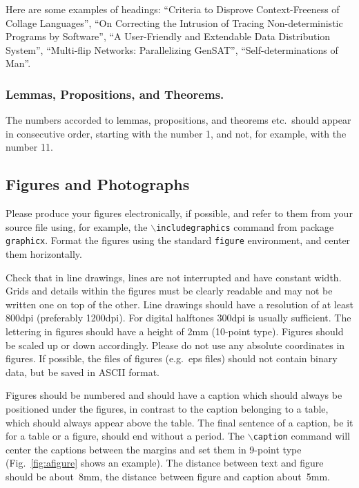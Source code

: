 \documentclass[runningheads]{comsis2}
\begin{document}
Here are some examples of headings: ``Criteria to Disprove Context-Freeness of
Collage Languages'', ``On Correcting the Intrusion of Tracing
Non-deterministic Programs by Software'', ``A User-Friendly and Extendable
Data Distribution System'', ``Multi-flip Networks: Parallelizing GenSAT'',
``Self-determinations of Man''.

\subsubsection{Lemmas, Propositions, and Theorems.} The numbers accorded to lemmas,
propositions, and theorems etc.\ should appear in consecutive order, starting
with the number 1, and not, for example, with the number 11.

\subsection{Figures and Photographs}

Please produce your figures electronically, if possible, and refer to them
from your source file using, for example, the
\texttt{$\backslash$includegraphics} command from package \texttt{graphicx}.
Format the figures using the standard \texttt{figure} environment, and center
them horizontally.

Check that in line drawings, lines are not interrupted and have constant
width. Grids and details within the figures must be clearly readable and may
not be written one on top of the other. Line drawings should have a resolution
of at least 800dpi (preferably 1200dpi). For digital halftones 300dpi is
usually sufficient. The lettering in figures should have a height of 2mm
(10-point type). Figures should be scaled up or down accordingly. Please do
not use any absolute coordinates in figures. If possible, the files of figures
(e.g.\ eps files) should not contain binary data, but be saved in ASCII
format.

Figures should be numbered and should have a caption which should always be
positioned under the figures, in contrast to the caption belonging to a table,
which should always appear above the table. The final sentence of a caption,
be it for a table or a figure, should end without a period. The
\texttt{$\backslash$caption} command will center the captions between the
margins and set them in 9-point type (Fig.~\ref{fig:afigure} shows an
example). The distance between text and figure should be about~8mm, the
distance between figure and caption about~5mm.
\end{document}
